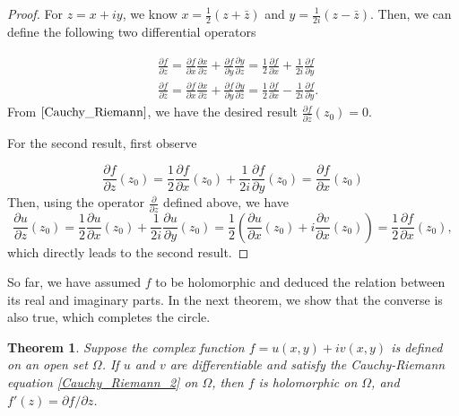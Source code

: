 \documentclass{article}
\newtheorem{theorem}{Theorem}
\begin{document}
\begin{proof}
For $z=x+iy$, we know $x=\frac{1}{2}(z+\bar{z})$ and $y=\frac{1}{2i}(z-\bar{z})$. Then, we can define the following two differential operators

\begin{equation*}
\begin{aligned}
&\frac{\partial f}{\partial z}=\frac{\partial f}{\partial x}\frac{\partial x}{\partial z}+\frac{\partial f}{\partial y}\frac{\partial y}{\partial z}=\frac{1}{2}\frac{\partial f}{\partial x}+\frac{1}{2i}\frac{\partial f}{\partial y}\\
&\frac{\partial f}{\partial \bar{z}}=\frac{\partial f}{\partial x}\frac{\partial x}{\partial \bar{z}}+\frac{\partial f}{\partial y}\frac{\partial y}{\partial \bar{z}}=\frac{1}{2}\frac{\partial f}{\partial x}-\frac{1}{2i}\frac{\partial f}{\partial y}.
\end{aligned}
\end{equation*}
From $\eqref{Cauchy_Riemann}$, we have the desired result $\frac{\partial f}{\partial\bar{z}}(z_0)=0$.

For the second result, first observe

\begin{equation*}
\frac{\partial f}{\partial z}(z_0)=\frac{1}{2}\frac{\partial f}{\partial x}(z_0)+\frac{1}{2i}\frac{\partial f}{\partial y}(z_0)=\frac{\partial f}{\partial x}(z_0)
\end{equation*}
Then, using the operator $\frac{\partial}{\partial z}$ defined above, we have
\begin{equation*}
\frac{\partial u}{\partial z}(z_0)=\frac{1}{2}\frac{\partial u}{\partial x}(z_0)+\frac{1}{2i}\frac{\partial u}{\partial y}(z_0)=\frac{1}{2}(\frac{\partial u}{\partial x}(z_0)+i\frac{\partial v}{\partial x}(z_0))=\frac{1}{2}\frac{\partial f}{\partial x}(z_0),
\end{equation*}
which directly leads to the second result.
\end{proof}

So far, we have assumed $f$ to be holomorphic and deduced the relation between its real and imaginary parts. In the next theorem, we show that the converse is also true, which completes the circle. 

\begin{theorem}
Suppose the complex function $f=u(x,y)+iv(x,y)$ is defined on an open set $\Omega$. If $u$ and $v$ are differentiable and satisfy the Cauchy-Riemann equation \eqref{Cauchy_Riemann_2} on $\Omega$, then $f$ is holomorphic on $\Omega$, and $f'(z)=\partial f/\partial z$.
\end{theorem}
\end{document}
